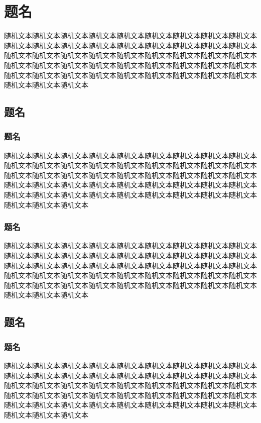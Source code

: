 \documentclass{paper}
\begin{document}
\section{题名}
随机文本随机文本随机文本随机文本随机文本随机文本随机文本随机文本随机文本随机文本随机文本随机文本随机文本随机文本随机文本随机文本随机文本随机文本随机文本随机文本随机文本随机文本随机文本随机文本随机文本随机文本随机文本随机文本随机文本随机文本随机文本随机文本随机文本随机文本随机文本随机文本随机文本随机文本随机文本随机文本随机文本随机文本随机文本随机文本随机文本随机文本随机文本随机文本
\subsection{题名}
\subsubsection{题名}
随机文本随机文本随机文本随机文本随机文本随机文本随机文本随机文本随机文本随机文本随机文本随机文本随机文本随机文本随机文本随机文本随机文本随机文本随机文本随机文本随机文本随机文本随机文本随机文本随机文本随机文本随机文本随机文本随机文本随机文本随机文本随机文本随机文本随机文本随机文本随机文本随机文本随机文本随机文本随机文本随机文本随机文本随机文本随机文本随机文本随机文本随机文本随机文本
\subsubsection{题名}
随机文本随机文本随机文本随机文本随机文本随机文本随机文本随机文本随机文本随机文本随机文本随机文本随机文本随机文本随机文本随机文本随机文本随机文本随机文本随机文本随机文本随机文本随机文本随机文本随机文本随机文本随机文本随机文本随机文本随机文本随机文本随机文本随机文本随机文本随机文本随机文本随机文本随机文本随机文本随机文本随机文本随机文本随机文本随机文本随机文本随机文本随机文本随机文本

\subsection{题名}
\subsubsection{题名}
随机文本随机文本随机文本随机文本随机文本随机文本随机文本随机文本随机文本随机文本随机文本随机文本随机文本随机文本随机文本随机文本随机文本随机文本随机文本随机文本随机文本随机文本随机文本随机文本随机文本随机文本随机文本随机文本随机文本随机文本随机文本随机文本随机文本随机文本随机文本随机文本随机文本随机文本随机文本随机文本随机文本随机文本随机文本随机文本随机文本随机文本随机文本随机文本
\end{document}
